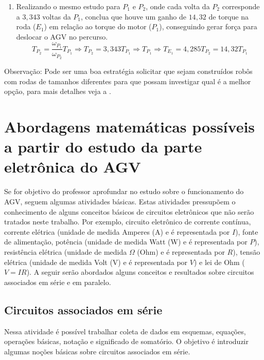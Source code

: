 \documentclass{textolivre}
\begin{document}
\begin{enumerate}
\item Realizando o mesmo estudo para $P_1$ e $P_2$, onde cada volta da $P_2$ corresponde a $3,343$ voltas da $P_1$, conclua que houve um ganho de $14,32$ de torque na roda ($E_1$) em relação ao torque do motor ($P_1$), conseguindo gerar força para deslocar o AGV no percurso.
\begin{equation*}
T_{P_2} = \frac{\omega_{P_1}}{\omega_{P_2}} T_{P_1} \Rightarrow T_{P_2} = 3,343 T_{P_1} \Rightarrow T_{P_1} \Rightarrow T_{E_1} = 4,285 T_{P_2} = 14,32 T_{P_1}
\end{equation*}

\end{enumerate}


Observação: Pode ser uma boa estratégia solicitar que sejam construídos robôs
com rodas de tamanhos diferentes para que possam investigar qual é a melhor
opção, para mais detalhes veja a .



\section{Abordagens matemáticas possíveis a partir do estudo da parte eletrônica do AGV}\label{sec-abordagens}
Se for objetivo do professor aprofundar no estudo sobre o funcionamento do AGV,
seguem algumas atividades básicas. Estas atividades pressupõem o conhecimento
de alguns conceitos básicos de circuitos eletrônicos que não serão tratados
neste trabalho. Por exemplo, circuito eletrônico de corrente contínua, corrente
elétrica (unidade de medida Amperes (A) e é representada por $I$), fonte de
alimentação, potência (unidade de medida Watt (W) e é representada por $P$),
resistência elétrica (unidade de medida $\Omega$ (Ohm) e é representada por $R$), tensão
elétrica (unidade de medida Volt (V) e é representada por $V$) e lei de Ohm ($V = IR$). 
A seguir serão abordados alguns conceitos e resultados sobre circuitos
associados em série e em paralelo.


\subsection{Circuitos associados em série}\label{sec-circuitos}
Nessa atividade é possível trabalhar coleta de dados em esquemas, equações,
operações básicas, notação e significado de somatório. O objetivo é introduzir
algumas noções básicas sobre circuitos associados em série.
\end{document}
